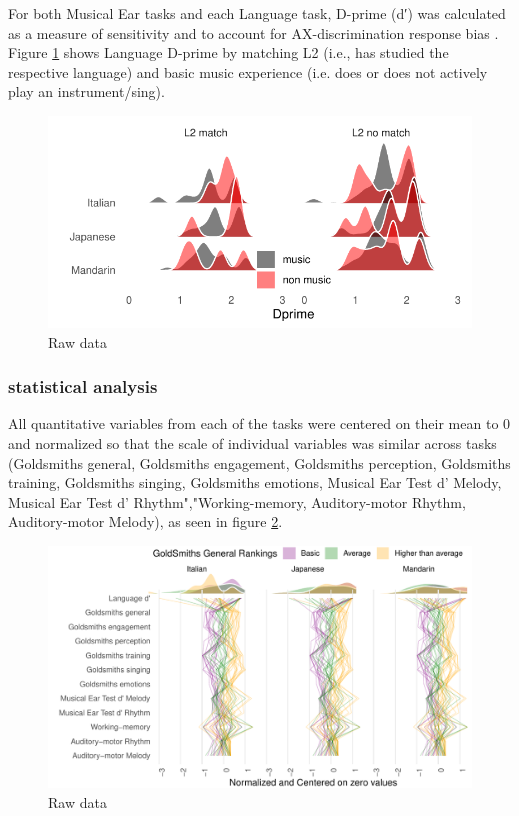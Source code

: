 \documentclass[a4paper]{article}
\begin{document}
For both Musical Ear tasks and each Language task,  D-prime (d′) was calculated as a measure of sensitivity and to account for AX-discrimination response bias \cite{Macmillan_Creelman_2004}. Figure \ref{fig:dprime} shows Language D-prime by matching L2 (i.e., has studied the respective language) and basic music experience (i.e. does or does not actively play an instrument/sing). 

\begin{figure}[t]
  \centering
  \includegraphics[width=\linewidth]{SP_24_visuals/dprime_density_across_tasks.pdf}
  \caption{Raw data}
  \label{fig:dprime}
\end{figure}

\subsubsection{statistical analysis}


All quantitative variables from each of the tasks were centered on their mean to 0 and normalized so that the scale of individual variables was similar across tasks (Goldsmiths general, Goldsmiths engagement, Goldsmiths perception, Goldsmiths training, Goldsmiths singing, Goldsmiths emotions, Musical Ear Test d' Melody, Musical Ear Test d' Rhythm","Working-memory, Auditory-motor Rhythm, Auditory-motor Melody), as seen in figure \ref{fig:centered_data}.

\begin{figure}[t]
  \centering
  \includegraphics[width=\textwidth]{SP_24_visuals/by_gs.pdf}
  \caption{Raw data}
  \label{fig:centered_data}
\end{figure}
\end{document}
